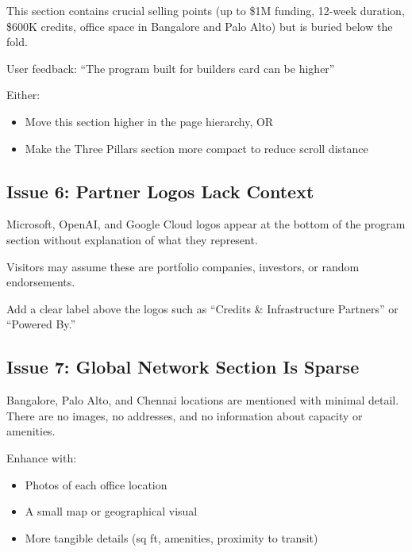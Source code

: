\documentclass[12pt,a4paper]{article}
\begin{document}
\begin{description}[leftmargin=!,labelwidth=\widthof{\bfseries Problem:}]
    \item[Problem:] This section contains crucial selling points (up to \$1M funding, 12-week duration, \$600K credits, office space in Bangalore and Palo Alto) but is buried below the fold.
    
    \item[Evidence:] User feedback: ``The program built for builders card can be higher''
    
    \item[Recommendation:] Either:
    \begin{itemize}
        \item Move this section higher in the page hierarchy, OR
        \item Make the Three Pillars section more compact to reduce scroll distance
    \end{itemize}
\end{description}

\subsection{Issue 6: Partner Logos Lack Context}

\begin{description}[leftmargin=!,labelwidth=\widthof{\bfseries Problem:}]
    \item[Problem:] Microsoft, OpenAI, and Google Cloud logos appear at the bottom of the program section without explanation of what they represent.
    
    \item[Impact:] Visitors may assume these are portfolio companies, investors, or random endorsements.
    
    \item[Recommendation:] Add a clear label above the logos such as ``Credits \& Infrastructure Partners'' or ``Powered By.''
\end{description}

\subsection{Issue 7: Global Network Section Is Sparse}

\begin{description}[leftmargin=!,labelwidth=\widthof{\bfseries Problem:}]
    \item[Problem:] Bangalore, Palo Alto, and Chennai locations are mentioned with minimal detail. There are no images, no addresses, and no information about capacity or amenities.
    
    \item[Recommendation:] Enhance with:
    \begin{itemize}
        \item Photos of each office location
        \item A small map or geographical visual
        \item More tangible details (sq ft, amenities, proximity to transit)
    \end{itemize}
\end{description}
\end{document}
